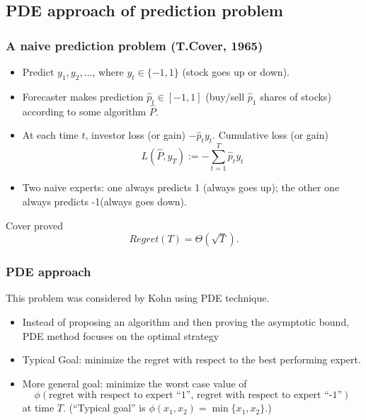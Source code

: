 \documentclass{beamer}
\begin{document}
\subsection{PDE approach of prediction problem}

\begin{frame}
\frametitle{A naive prediction problem (T.Cover, 1965)}
\begin{itemize}
\item Predict $y_1,y_2,\ldots$, where $y_t\in\{-1,1\}$ ({\color{blue}stock goes up or down}). 
\pause
\item Forecaster makes prediction $\hat{p}_t\in[-1,1]$ ({\color{blue}buy/sell $\hat{p}_1$ shares of stocks}) according to some algorithm $\hat{P}$. 
\pause
\item At each time $t$, investor loss (or gain) $-\hat{p}_ty_t$. Cumulative loss (or gain)
$$L(\hat{P},y_T) := -\sum_{t=1}^T\hat{p}_ty_t$$
\pause
\item Two naive experts: one always predicts 1 ({\color{blue}always goes up}); the other one always predicts -1({\color{blue}always goes down}).
\end{itemize}
Cover proved $$Regret(T) = \Theta(\sqrt{T}).$$

\end{frame}

\begin{frame}
\frametitle{PDE approach}
This problem was considered by Kohn using PDE technique.  
\begin{itemize}
\item Instead of proposing an algorithm and then proving the asymptotic bound, PDE method focuses on the optimal strategy
\pause
\item Typical Goal: minimize the regret with respect to the best performing expert.
\pause
\item More general goal: minimize the worst case value of 
$$\phi(\text{regret with respect to expert ``1'', regret with respect to expert ``-1''})$$
at time $T$. (``Typical goal'' is $\phi(x_1,x_2) = \min\{x_1,x_2\}$.)
\end{itemize}


\end{frame}
\end{document}
